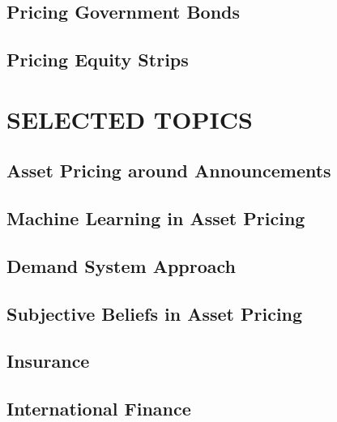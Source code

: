 \documentclass[
]{book}
\begin{document}
\hypertarget{pricing-government-bonds}{%
\chapter{Pricing Government Bonds}\label{pricing-government-bonds}}

\hypertarget{pricing-equity-strips}{%
\chapter{Pricing Equity Strips}\label{pricing-equity-strips}}

\hypertarget{part-selected-topics}{%
\part*{SELECTED TOPICS}\label{part-selected-topics}}

\hypertarget{asset-pricing-around-announcements}{%
\chapter{Asset Pricing around Announcements}\label{asset-pricing-around-announcements}}

\hypertarget{machine-learning-in-asset-pricing}{%
\chapter{Machine Learning in Asset Pricing}\label{machine-learning-in-asset-pricing}}

\hypertarget{demand-system-approach}{%
\chapter{Demand System Approach}\label{demand-system-approach}}

\hypertarget{subjective-beliefs-in-asset-pricing}{%
\chapter{Subjective Beliefs in Asset Pricing}\label{subjective-beliefs-in-asset-pricing}}

\hypertarget{insurance}{%
\chapter{Insurance}\label{insurance}}

\hypertarget{international-finance}{%
\chapter{International Finance}\label{international-finance}}
\end{document}
